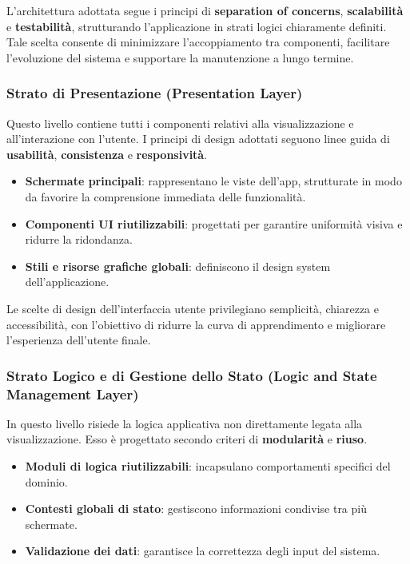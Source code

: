 \documentclass{book}
\begin{document}
L’architettura adottata segue i principi di \textbf{separation of concerns}, \textbf{scalabilità} e \textbf{testabilità}, strutturando l’applicazione in strati logici chiaramente definiti. Tale scelta consente di minimizzare l’accoppiamento tra componenti, facilitare l’evoluzione del sistema e supportare la manutenzione a lungo termine.

\subsubsection{Strato di Presentazione (Presentation Layer)}
Questo livello contiene tutti i componenti relativi alla visualizzazione e all’interazione con l’utente. I principi di design adottati seguono linee guida di \textbf{usabilità}, \textbf{consistenza} e \textbf{responsività}.
\begin{itemize}
    \item \textbf{Schermate principali}: rappresentano le viste dell’app, strutturate in modo da favorire la comprensione immediata delle funzionalità.
    \item \textbf{Componenti UI riutilizzabili}: progettati per garantire uniformità visiva e ridurre la ridondanza.
    \item \textbf{Stili e risorse grafiche globali}: definiscono il design system dell’applicazione.
\end{itemize}
Le scelte di design dell’interfaccia utente privilegiano semplicità, chiarezza e accessibilità, con l’obiettivo di ridurre la curva di apprendimento e migliorare l’esperienza dell’utente finale.

\subsubsection{Strato Logico e di Gestione dello Stato (Logic and State Management Layer)}
In questo livello risiede la logica applicativa non direttamente legata alla visualizzazione. Esso è progettato secondo criteri di \textbf{modularità} e \textbf{riuso}.
\begin{itemize}
    \item \textbf{Moduli di logica riutilizzabili}: incapsulano comportamenti specifici del dominio.
    \item \textbf{Contesti globali di stato}: gestiscono informazioni condivise tra più schermate.
    \item \textbf{Validazione dei dati}: garantisce la correttezza degli input del sistema.
\end{itemize}
\end{document}
